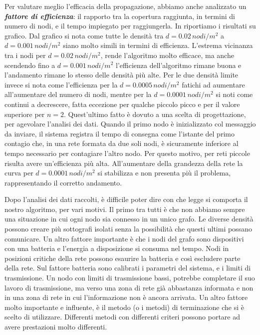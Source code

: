 Per valutare meglio l'efficacia della propagazione, abbiamo anche analizzato un \textit{\textbf{fattore di efficienza}}: il rapporto tra la copertura raggiunta, in termini di numero di nodi, e il tempo impiegato per raggiungerla. In  riportiamo i risultati su grafico. Dal grafico si nota come tutte le densità tra $d=0.02\, nodi/m^2$ a $d=0.001\, nodi/m^2$ siano molto simili in termini di efficienza. L'estrema vicinanza tra i nodi per $d=0.02\, nodi/m^2$, rende l'algoritmo molto efficace, ma anche scendendo fino a $d=0.001\, nodi/m^2$ l'efficienza dell'algoritmo rimane buona e l'andamento rimane lo stesso delle densità più alte. Per le due densità limite invece si nota come l'efficienza per la $d=0.0005\, nodi/m^2$ fatichi ad aumentare all'aumentare del numero di nodi, mentre per la $d=0.0001\, nodi/m^2$ si noti come continui a decrescere, fatta eccezione per qualche piccolo picco e per il valore superiore per $n=2$. Quest'ultimo fatto è dovuto a una scelta di progettazione, per agevolare l'analisi dei dati. Quando il primo nodo è inizializzato col messaggio da inviare, il sistema registra il tempo di consegna come l'istante del primo contagio che, in una rete formata da due soli nodi, è sicuramente inferiore al tempo necessario per contagiare l'altro nodo. Per questo motivo, per reti piccole risulta avere un'efficienza più alta. All'aumentare della grandezza della rete la curva per $d=0.0001\, nodi/m^2$ si stabilizza e non presenta più il problema, rappresentando il corretto andamento.

Dopo l'analisi dei dati raccolti, è difficile poter dire con che legge si comporta il nostro algoritmo, per vari motivi. Il primo tra tutti è che non abbiamo sempre una situazione in cui ogni nodo sia connesso in un unico grafo. Le diverse densità possono creare più sottografi isolati senza la possibilità che questi ultimi possano comunicare. Un altro fattore importante è che i nodi del grafo sono dispositivi con una batteria e l'energia a disposizione si consuma nel tempo. Nodi in posizioni critiche della rete possono esaurire la batteria e così escludere parte della rete. Sul fattore batteria sono calibrati i parametri del sistema, e i limiti di trasmissione. Un nodo con limiti di trasmissione bassi, potrebbe completare il suo lavoro di trasmissione, ma verso una zona di rete già abbastanza informata e non in una zona di rete in cui l'informazione non è ancora arrivata. Un altro fattore molto importante e influente, è il metodo (o i metodi) di terminazione che si è scelto di utilizzare. Differenti metodi con differenti criteri possono portare ad avere prestazioni molto differenti.

